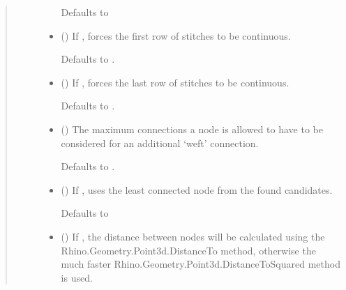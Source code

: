 \documentclass[letterpaper,10pt,english]{sphinxmanual}
\begin{document}
\begin{fulllineitems}
\begin{fulllineitems}
\begin{quote}
\begin{description}
\begin{itemize}
Defaults to 


\item {} 
 (\sphinxstyleliteralemphasis{\sphinxupquote{, }}) \textendash{} 
If , forces the first row of stitches to be continuous.

Defaults to .


\item {} 
 (\sphinxstyleliteralemphasis{\sphinxupquote{, }}) \textendash{} 
If , forces the last row of stitches to be continuous.

Defaults to .


\item {} 
 (\sphinxstyleliteralemphasis{\sphinxupquote{, }}) \textendash{} 
The maximum connections a node is allowed to have to be considered
for an additional ‘weft’ connection.

Defaults to .


\item {} 
 (\sphinxstyleliteralemphasis{\sphinxupquote{, }}) \textendash{} 
If , uses the least connected node from the found
candidates.

Defaults to 


\item {} 
 (\sphinxstyleliteralemphasis{\sphinxupquote{, }}) \textendash{} 
If , the distance between nodes will be calculated using
the Rhino.Geometry.Point3d.DistanceTo method, otherwise the much
faster Rhino.Geometry.Point3d.DistanceToSquared method is used.


\end{itemize}
\end{description}
\end{quote}
\end{fulllineitems}
\end{fulllineitems}
\end{document}
